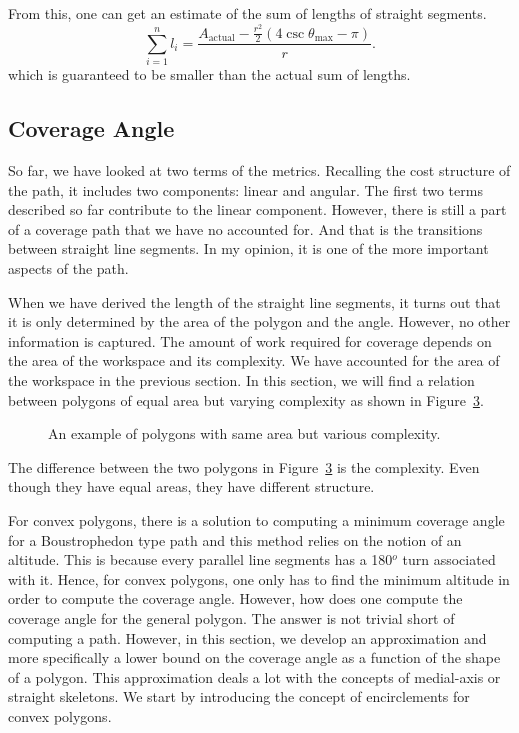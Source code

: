 \documentclass[../main.tex]{subfiles}
\begin{document}
From this, one can get an estimate of the sum of lengths of straight segments.
\begin{equation}
	\sum_{i=1}^nl_i=\frac{A_{\text{actual}}-\frac{r^2}{2}(4\csc\theta_{\max}-\pi)}{r}.
\end{equation}
which is guaranteed to be smaller than the actual sum of lengths.


\subsection{Coverage Angle}

So far, we have looked at two terms of the metrics. Recalling the cost structure of the path, it includes two components: linear and angular. The first two terms described so far contribute to the linear component. However, there is still a part of a coverage path that we have no accounted for. And that is the transitions between straight line segments. In my opinion, it is one of the more important aspects of the path.

When we have derived the length of the straight line segments, it turns out that it is only determined by the area of the polygon and the angle. However, no other information is captured. The amount of work required for coverage depends on the area of the workspace and its complexity. We have accounted for the area of the workspace in the previous section. In this section, we will find a relation between polygons of equal area but varying complexity as shown in Figure~\ref{fig:area_complexity}.

\begin{figure}
	\centering
	\begin{subfigure}{0.5\linewidth}
		\centering
		\caption{\label{fig:area_complexity_i}}
	\end{subfigure}%
	\begin{subfigure}{0.5\linewidth}
		\centering
		
		\caption{\label{fig:area_complexity_ii}}
	\end{subfigure}
	\caption{An example of polygons with same area but various complexity.}
	\label{fig:area_complexity}
\end{figure}

The difference between the two polygons in Figure~\ref{fig:area_complexity} is the complexity. Even though they have equal areas, they have different structure.

For convex polygons, there is a solution to computing a minimum coverage angle for a Boustrophedon type path and this method relies on the notion of an altitude. This is because every parallel line segments has a 180$^o$ turn associated with it. Hence, for convex polygons, one only has to find the minimum altitude in order to compute the coverage angle. However, how does one compute the coverage angle for the general polygon. The answer is not trivial short of computing a path. However, in this section, we develop an approximation and more specifically a lower bound on the coverage angle as a function of the shape of a polygon. This approximation deals a lot with the concepts of medial-axis or straight skeletons. We start by introducing the concept of encirclements for convex polygons.
\end{document}
